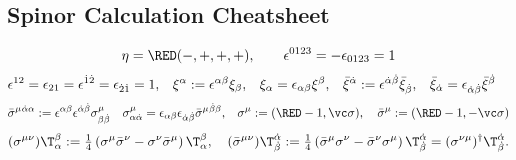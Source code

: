 \subsection{Spinor Calculation Cheatsheet}
\begin{preposition}{}\vspace{-.5zw}
\begin{align*}
 \eta = {\RED(-,+,+,+)},\qquad\epsilon^{0123}=-\epsilon_{0123} = 1
\end{align*}\vspace{-2.8zw}
\begin{align*}
  \epsilon^{12}=\epsilon_{21}=\epsilon^{\dot1\dot2}=\epsilon_{\dot2\dot1}&=1,&
\xi^\alpha&:=\epsilon^{\alpha\beta}\xi_\beta,& \xi_\alpha&=\epsilon_{\alpha\beta}\xi^\beta,&
\bar\xi^{\dot\alpha}&:=\epsilon^{{\dot\alpha}{\dot\beta}}\bar\xi_{\dot\beta},& \bar\xi_{\dot\alpha}&=\epsilon_{{\dot\alpha}{\dot\beta}}\bar\xi^{\dot\beta}
\end{align*}\vspace{-2.8zw}
\begin{align*}
  \bSm{}^{\dalpha\alpha} &:= \epsilon^{\alpha\beta}\epsilon^{\dalpha\dbeta}\Sm_{\beta\dbeta}&
 \Sm_{\alpha\dalpha}&= \epsilon_{\alpha\beta}\epsilon_{\dalpha\dbeta}\bSm{}^{\dbeta\beta},&
 \Sm:=({\RED-1},\vc\sigma),\quad\bSm:=({\RED-1},-\vc\sigma)
\end{align*}\vspace{-2.8zw}
\begin{align*}
  (\Smn)\T_\alpha^\beta:=\tfrac14\left(\Sm\bSn-\Sn\bSm\right)\T_{\alpha}^\beta,\quad
 (\bSmn)\T^\dalpha_\dbeta:=\tfrac14\left(\bSm\Sn-\bSn\Sm\right)\T^{\dalpha}_\dbeta =
(\Snm)^\dagger{}\T^\dalpha_\dbeta.
\end{align*}\vspace{-2.7zw}
\end{preposition}\vspace{-1.2zw}

